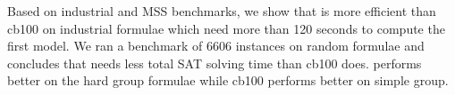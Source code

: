 \medskip

Based on industrial and MSS benchmarks, we show that \tool is more efficient than cb100 on industrial formulae which need more than 120 seconds to compute the first model. We ran a benchmark of 6606 instances on random formulae and concludes that \tool needs less total SAT solving time than cb100 does. \tool performs better on the hard group formulae while cb100 performs better on simple group.





